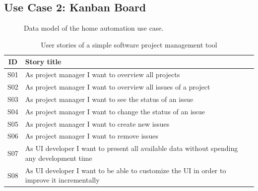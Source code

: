\subsection{Use Case 2: Kanban Board}\label{usecases}

\begin{figure}[!htb]
  \caption{\label{fig:my-label} Data model of the home automation use case.}
\end{figure}

\begin{table}
\begin{center}
\begin{tabular}{ |c|l| }
 \hline
 ID & Story title \\
 \hline
 S01 & As project manager I want to overview all projects \\
 S02 & As project manager I want to overview all issues of a project \\
 S03 & As project manager I want to see the status of an issue \\
 S04 & As project manager I want to change the status of an issue \\
 S05 & As project manager I want to create new issues \\
 S06 & As project manager I want to remove issues \\
 S07 & As UI developer I want to present all available data without spending any development time \\
 S08 & As UI developer I want to be able to customize the UI in order to improve it incrementally \\
 \hline
\end{tabular}
\caption{User stories of a simple software project management tool}
\end{center}
\end{table}

